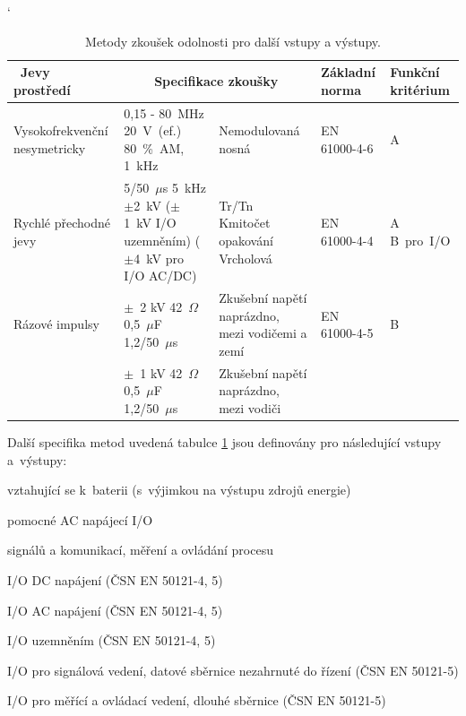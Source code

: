 \begin{table}[!h]
\catcode`
\begin{center}
  	\caption{Metody zkoušek odolnosti pro další vstupy a výstupy.}
  	\label{tab:emc_odolnosti2}
\begin{tabular}{|p{}|p{}|p{}|p{}|p{}|}
	\hline
	{\bf\ Jevy prostředí} 	& \multicolumn{2}{c}{\bf Specifikace zkoušky}\vline & {\bf Základní norma} & {\bf Funkční kritérium} \\
	\hline
	\hline
Vysokofrekvenční nesymetricky & 0,15 - 80~MHz 20~V~(ef.) 80~\%~AM, 1~kHz & Nemodulovaná nosná	& \begin{center}EN 61000-4-6 \end{center}& \begin{center} A~\end{center} \\ 
	\hline
Rychlé přechodné jevy & 5/50~$\mu$s 5~kHz $\pm$2~kV ($\pm$1~kV I/O uzemněním) ($\pm$4~kV pro I/O AC/DC)& Tr/Tn Kmitočet opakování Vrcholová & \begin{center}  EN 61000-4-4 \end{center} & \begin{center} A \mbox{B pro I/O} \end{center} \\
	\hline
	Rázové impulsy & $\pm$~2 kV 42~$\Omega$ 0,5~$\mu$F 1,2/50~$\mu$s  & Zkušební napětí naprázdno, mezi vodičemi a zemí & \begin{center}  EN 61000-4-5 \end{center} & \begin{center} B \end{center} \\
	\cline{2-3}
			& $\pm$~1 kV 42~$\Omega$ 0,5~$\mu$F 1,2/50~$\mu$s& Zkušební napětí naprázdno, mezi vodiči &  &  \\
	\hline
\end{tabular}
\end{center}
\end{table}
Další specifika metod uvedená tabulce \ref{tab:emc_odolnosti2} jsou definovány pro následující vstupy a~výstupy:
\begin{itemize*}
\item vztahující se k~baterii  (s~výjimkou na výstupu zdrojů energie)
\item pomocné AC napájecí I/O
\item signálů a komunikací, měření a ovládání procesu
\item I/O DC napájení (ČSN EN 50121-4, 5)
\item I/O AC napájení (ČSN EN 50121-4, 5)
\item I/O uzemněním (ČSN EN 50121-4, 5)
\item I/O pro signálová vedení, datové sběrnice nezahrnuté do řízení (ČSN EN 50121-5)
\item I/O pro měřící a ovládací vedení, dlouhé sběrnice (ČSN EN 50121-5)
\end{itemize*}

